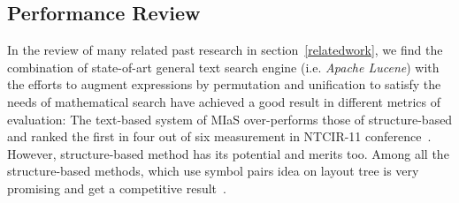 \subsection{Performance Review}
In the review of many related past research in section~\ref{relatedwork}, we find the combination of state-of-art general text search engine (i.e. \textit{Apache Lucene}) with the efforts to augment expressions by permutation and unification to satisfy the needs of mathematical search have achieved a good result in different metrics of evaluation: 
The text-based system of MIaS over-performs those of structure-based and ranked the first in four out of six measurement in NTCIR-11 conference~\cite{NTCIR11res}. 
However, structure-based method has its potential and merits too. 
Among all the structure-based methods, \cite{symbolpairs15,symbolpair15:2} which use symbol pairs idea on layout tree is very promising and get a competitive result~\cite{NTCIR11res}.
